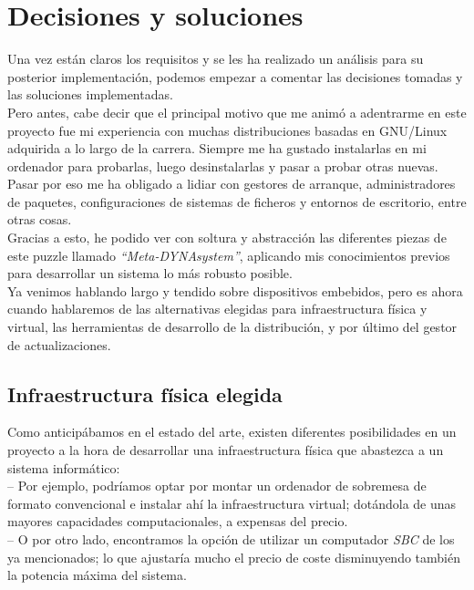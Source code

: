 \chapter{Decisiones y soluciones}

Una vez están claros los requisitos y se les ha realizado un análisis para su posterior implementación, podemos empezar a comentar las decisiones tomadas y las soluciones implementadas.\\

Pero antes, cabe decir que el principal motivo que me animó a adentrarme en este proyecto fue mi experiencia con muchas distribuciones basadas en GNU/Linux adquirida a lo largo de la carrera. Siempre me ha gustado instalarlas en mi ordenador para probarlas, luego desinstalarlas y pasar a probar otras nuevas. Pasar por eso me ha obligado a lidiar con gestores de arranque, administradores de paquetes, configuraciones de sistemas de ficheros y entornos de escritorio, entre otras cosas.\\

Gracias a esto, he podido ver con soltura y abstracción las diferentes piezas de este puzzle llamado \textit{``Meta-DYNAsystem''}, aplicando mis conocimientos previos para desarrollar un sistema lo más robusto posible.\\

Ya venimos hablando largo y tendido sobre dispositivos embebidos, pero es ahora cuando hablaremos de las alternativas elegidas para infraestructura física y virtual, las herramientas de desarrollo de la distribución, y por último del gestor de actualizaciones.

\section{Infraestructura física elegida}

Como anticipábamos en el estado del arte, existen diferentes posibilidades en un proyecto a la hora de desarrollar una infraestructura física que abastezca a un sistema informático:\\

-- Por ejemplo, podríamos optar por montar un ordenador de sobremesa de formato convencional e instalar ahí la infraestructura virtual; dotándola de unas mayores capacidades computacionales, a expensas del precio.\\

-- O por otro lado, encontramos la opción de utilizar un computador \textit{SBC} de los ya mencionados; lo que ajustaría mucho el precio de coste disminuyendo también la potencia máxima del sistema.\\

